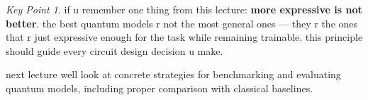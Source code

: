 \documentclass[11pt,a4paper]{article}
\theoremstyle{definition}
\theoremstyle{remark}
\newtheorem*{keypoint}{Key Point}
\begin{document}
\begin{keypoint}
if u remember one thing from this lecture: \textbf{more expressive is not better}. the best quantum models r not the most general ones --- they r the ones that r just expressive enough for the task while remaining trainable. this principle should guide every circuit design decision u make.
\end{keypoint}

next lecture well look at concrete strategies for benchmarking and evaluating quantum models, including proper comparison with classical baselines.
\end{document}
